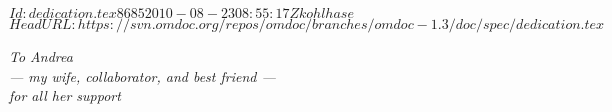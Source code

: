 \svnInfo $Id: dedication.tex 8685 2010-08-23 08:55:17Z kohlhase $
\svnKeyword $HeadURL: https://svn.omdoc.org/repos/omdoc/branches/omdoc-1.3/doc/spec/dedication.tex $

\thispagestyle{empty}
\vspace*{3.5cm}
\begin{center}\LARGE\sl
  To Andrea\\
  --- my wife, collaborator, and best friend ---\\
  for all her support
\end{center}


